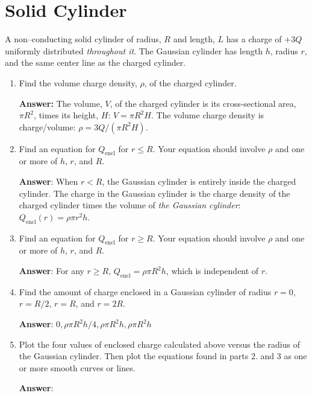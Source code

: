 \documentclass{article}
\begin{document}
\newpage

\section{Solid Cylinder}

A non--conducting solid cylinder of radius, $R$ and length, $L$ has a charge of $+3Q$ uniformly distributed \emph{throughout it}. The Gaussian cylinder has length $h$, radius $r$, and the same center line as the charged cylinder.



\begin{enumerate}

  \item Find the volume charge density, $\rho$, of the charged cylinder.

        \ifsolutions
        {\bf Answer:} The volume, $V$, of the charged cylinder is its cross-sectional area, $\pi R^2$, times its height, $H$: $V=\pi R^2 H$. The volume charge density is charge/volume: $\rho=3Q/(\pi R^2 H)$.
        \fi

        \ifsolutions\else
        \vskip 36pt
        \fi

  \item Find an equation for $Q_{\text{encl}}$ for $r\le R$. Your equation should involve $\rho$ and one or more of $h$, $r$, and $R$.

        \ifsolutions
        {\bf Answer}: When $r<R$, the Gaussian cylinder is entirely inside the charged cylinder. The charge in the Gaussian cylinder is the charge density of the charged cylinder times the volume of \emph{the Gaussian cylinder}: $Q_{\text{encl}}(r)=\rho \pi r^2 h$.
        \fi

        \ifsolutions\else
        \vskip 36pt
        \fi

  \item Find an equation for $Q_{\text{encl}}$ for $r\ge R$. Your equation should involve $\rho$ and one or more of $h$, $r$, and $R$.

        \ifsolutions
        {\bf Answer}: For any $r\ge R$, $Q_{\text{encl}}=\rho \pi R^2 h$, which is independent of $r$. 
        \fi

        \ifsolutions\else
        \vskip 36pt
        \fi

  \item Find the amount of charge enclosed in a Gaussian cylinder of radius $r=0$, $r=R/2$, $r=R$, and $r=2R$.

        \ifsolutions
        {\bf Answer}:  $0, \rho\pi R^2 h/4, \rho \pi R^2 h, \rho \pi R^2 h$
        \fi

        \ifsolutions\else
        \vskip 36pt
        \fi

  \item Plot the four values of enclosed charge calculated above versus the radius of the Gaussian cylinder. Then plot the equations found in parts 2. and 3 as one or more smooth curves or lines.

        \ifsolutions
        {\bf Answer}:

        
        \fi

\end{enumerate}
\end{document}
